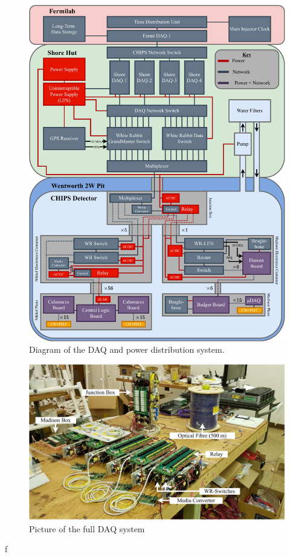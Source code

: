 \begin{figure} %
    \includegraphics[width=\textwidth]{diagrams/5-daq/daq.pdf}
    \caption[Diagram of the \chipsfive data acquisition and power distribution system.]
    {Diagram of the \chipsfive DAQ and power distribution system.}
    \label{fig:daq}
\end{figure}

\begin{figure} %
    \includegraphics[width=\textwidth]{diagrams/5-daq/full_setup.pdf}
    \caption[full set up short]
    {Picture of the full \chipsfive DAQ system}
    \label{fig:full_setup}
\end{figure}f

